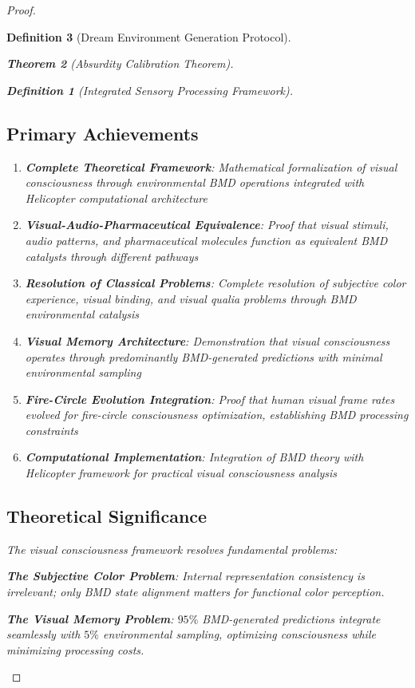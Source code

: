 \documentclass[12pt,a4paper]{article}
\newtheorem{theorem}{Theorem}[section]
\newtheorem{definition}[theorem]{Definition}
\begin{document}
\begin{proof}
\begin{definition}[Dream Environment Generation Protocol]
\begin{theorem}[Absurdity Calibration Theorem]
\begin{observation}
\begin{definition}[Integrated Sensory Processing Framework]
\subsection{Primary Achievements}

\begin{enumerate}
\item \textbf{Complete Theoretical Framework}: Mathematical formalization of visual consciousness through environmental BMD operations integrated with Helicopter computational architecture

\item \textbf{Visual-Audio-Pharmaceutical Equivalence}: Proof that visual stimuli, audio patterns, and pharmaceutical molecules function as equivalent BMD catalysts through different pathways

\item \textbf{Resolution of Classical Problems}: Complete resolution of subjective color experience, visual binding, and visual qualia problems through BMD environmental catalysis

\item \textbf{ Visual Memory Architecture}: Demonstration that visual consciousness operates through predominantly BMD-generated predictions with minimal environmental sampling

\item \textbf{Fire-Circle Evolution Integration}: Proof that human visual frame rates evolved for fire-circle consciousness optimization, establishing BMD processing constraints

\item \textbf{Computational Implementation}: Integration of BMD theory with Helicopter framework for practical visual consciousness analysis
\end{enumerate}

\subsection{Theoretical Significance}

The visual consciousness framework resolves fundamental problems:

\textbf{The Subjective Color Problem}: Internal representation consistency is irrelevant; only BMD state alignment matters for functional color perception.

\textbf{The Visual Memory Problem}: $95\%$ BMD-generated predictions integrate seamlessly with $5\%$ environmental sampling, optimizing consciousness while minimizing processing costs.


\end{definition}
\end{observation}
\end{theorem}
\end{definition}
\end{proof}
\end{document}
